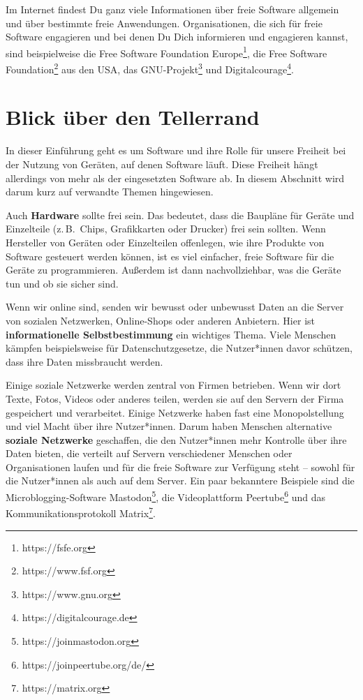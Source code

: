 \documentclass[a5paper,12pt]{scrartcl}
\begin{document}
Im Internet findest Du ganz viele Informationen über freie Software
allgemein und über bestimmte freie Anwendungen. Organisationen, die
sich für freie Software engagieren und bei denen Du Dich informieren
und engagieren kannst, sind beispielweise die Free Software Foundation
Europe\footnote{https://fsfe.org}, die Free Software
Foundation\footnote{https://www.fsf.org} aus den USA, das
GNU-Projekt\footnote{https://www.gnu.org} und
Digitalcourage\footnote{https://digitalcourage.de}.


\section{Blick über den Tellerrand}

In dieser Einführung geht es um Software und ihre Rolle für unsere
Freiheit bei der Nutzung von Geräten, auf denen Software läuft. Diese
Freiheit hängt allerdings von mehr als der eingesetzten Software
ab. In diesem Abschnitt wird darum kurz auf verwandte Themen
hingewiesen.

Auch \textbf{Hardware} sollte frei sein. Das bedeutet, dass die
Baupläne für Geräte und Einzelteile (z.\,B.\ Chips, Grafikkarten oder
Drucker) frei sein sollten. Wenn Hersteller von Geräten oder
Einzelteilen offenlegen, wie ihre Produkte von Software gesteuert
werden können, ist es viel einfacher, freie Software für die Geräte zu
programmieren. Außerdem ist dann nachvollziehbar, was die Geräte tun
und ob sie sicher sind.

Wenn wir online sind, senden wir bewusst oder unbewusst Daten an die
Server von sozialen Netzwerken, Online-Shops oder anderen
Anbietern. Hier ist \textbf{informationelle Selbstbestimmung} ein
wichtiges Thema. Viele Menschen kämpfen beispielsweise für
Datenschutzgesetze, die Nutzer*innen davor schützen, dass ihre Daten
missbraucht werden.

Einige soziale Netzwerke werden zentral von Firmen betrieben. Wenn wir
dort Texte, Fotos, Videos oder anderes teilen, werden sie auf den
Servern der Firma gespeichert und verarbeitet. Einige Netzwerke haben
fast eine Monopolstellung und viel Macht über ihre Nutzer*innen. Darum
haben Menschen alternative \textbf{soziale Netzwerke} geschaffen, die
den Nutzer*innen mehr Kontrolle über ihre Daten bieten, die verteilt
auf Servern verschiedener Menschen oder Organisationen laufen und für
die freie Software zur Verfügung steht -- sowohl für die Nutzer*innen
als auch auf dem Server. Ein paar bekanntere Beispiele sind die
Microblogging-Software Mastodon\footnote{https://joinmastodon.org},
die Videoplattform Peertube\footnote{https://joinpeertube.org/de/} und
das Kommunikationsprotokoll Matrix\footnote{https://matrix.org}.
\end{document}
